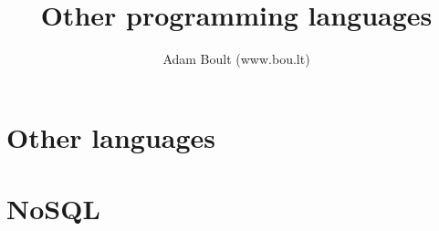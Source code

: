 \documentclass[oneside]{book}
\begin{document}
\author{Adam Boult (www.bou.lt)}
\title{Other programming languages}
\maketitle

\setcounter{tocdepth}{0}
\tableofcontents



\part{Other languages}



\part{NoSQL}

\end{document}
